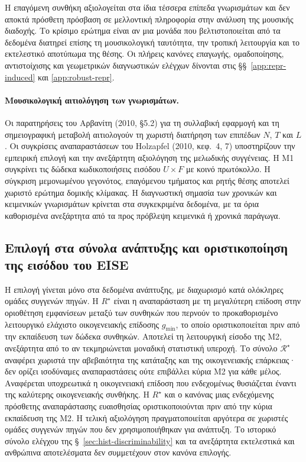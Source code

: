 \documentclass[11pt,a4paper]{article}
\begin{document}
Η επαγόμενη συνθήκη αξιολογείται στα ίδια τέσσερα επίπεδα γνωρισμάτων και δεν αποκτά πρόσθετη πρόσβαση σε μελλοντική πληροφορία στην ανάλυση της μουσικής διαδοχής. Το κρίσιμο ερώτημα είναι αν μια μονάδα που βελτιστοποιείται από τα δεδομένα διατηρεί επίσης τη μουσικολογική ταυτότητα, την τροπική λειτουργία και το εκτελεστικό αποτύπωμα της θέσης. Οι πλήρεις κανόνες επαγωγής, ομαδοποίησης, αντιστοίχισης και γεωμετρικών διαγνωστικών ελέγχων δίνονται στις §§~\ref{app:repr-induced} και \ref{app:robust-repr}.

\paragraph{Μουσικολογική αιτιολόγηση των γνωρισμάτων.} Οι παρατηρήσεις του Αρβανίτη (2010, §5.2) για τη συλλαβική εφαρμογή και τη σημειογραφική μεταβολή αιτιολογούν τη χωριστή διατήρηση των επιπέδων $N$, $T$ και $L$. Οι συγκρίσεις αναπαραστάσεων του Holzapfel (2010, κεφ.~4, 7) υποστηρίζουν την εμπειρική επιλογή και την ανεξάρτητη αξιολόγηση της μελωδικής συγγένειας. Η M1 συγκρίνει τις δώδεκα κωδικοποιήσεις εισόδου $U\times F$ με κοινό πρωτόκολλο. Η σύγκριση μεμονωμένου γεγονότος, επαγόμενου τμήματος και ρητής θέσης αποτελεί χωριστό ερώτημα δομικής κλίμακας. Η διαγνωστική σημασία των χρονικών και κειμενικών γνωρισμάτων κρίνεται στα συγκεκριμένα δεδομένα, με τα όρια καθορισμένα ανεξάρτητα από τα προς πρόβλεψη κειμενικά ή χρονικά παράγωγα.

\subsection{Επιλογή στα σύνολα ανάπτυξης και οριστικοποίηση της εισόδου του EISE}

Η επιλογή γίνεται μόνο στα δεδομένα ανάπτυξης, με διαχωρισμό κατά ολόκληρες ομάδες συγγενών πηγών. Η $R^\star$ είναι η αναπαράσταση με τη μεγαλύτερη επίδοση στην οριοθέτηση εμφανίσεων μεταξύ των συνθηκών που περνούν το προκαθορισμένο λειτουργικό ελάχιστο οικογενειακής επίδοσης $g_{\min}$, το οποίο οριστικοποιείται πριν από την εκπαίδευση των δώδεκα συνθηκών. Αποτελεί τη λειτουργική είσοδο της M2, ανεξάρτητα από το αν τεκμηριώνεται μοναδική στατιστική υπεροχή. Το σύνολο $\mathcal R^\star$ αναφέρει χωριστά την αβεβαιότητα της κατάταξης και της οικογενειακής επάρκειας· δεν ορίζει ισοδύναμες αναπαραστάσεις ούτε επιβάλλει κύρια M2 για κάθε μέλος. Αναφέρεται υποχρεωτικά η οικογενειακή επίδοση που ενδεχομένως θυσιάζεται έναντι της καλύτερης οικογενειακής συνθήκης. Η $R^\star$ και ο κανόνας μιας ενδεχόμενης πρόσθετης αναπαράστασης ευαισθησίας οριστικοποιούνται πριν από την κύρια εκπαίδευση της M2. Η τελική αξιολόγηση πραγματοποιείται αργότερα σε χωριστές ομάδες συγγενών πηγών που δεν χρησιμοποιήθηκαν για ανάπτυξη. Το ιστορικό σύνολο ελέγχου της §~\ref{sec:hist-discriminability} και τα ανεξάρτητα εκτελεστικά και ανθρώπινα αποτελέσματα δεν συμμετέχουν στον κανόνα επιλογής.
\end{document}
